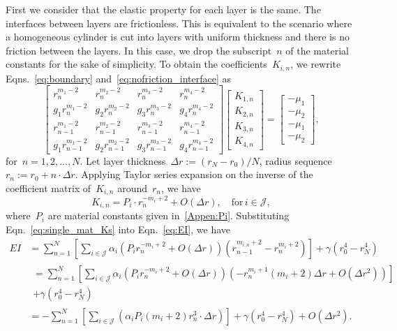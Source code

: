 \documentclass[preprint,10pt,times]{elsarticle}
\numberwithin{equation}{section}
\newcommand{\pr}[1]{\left( #1 \right)}
\renewcommand{\>}{$\Rightarrow$}
\begin{document}
First we consider that the elastic property for each layer is the same. The interfaces between layers are frictionless. This is equivalent to the scenario where a homogeneous cylinder is cut into layers with uniform thickness and there is no friction between the layers. In this case, we drop the subscript~$n$ of the material constants for the sake of simplicity. To obtain the coefficients~$K_{i,n}$, we rewrite Eqns.~\eqref{eq:boundary} and~\eqref{eq:nofriction_interface} as
\begin{equation}
	\begin{bmatrix}
	r_n^{m_1 - 2} & r_n^{m_2 - 2} & r_n^{m_3 - 2} & r_n^{m_4 - 2} \\
	g_1 r_n^{m_1 - 2} & g_2 r_n^{m_2 - 2} & g_3 r_n^{m_3 - 2} & g_4 r_n^{m_4 - 2} \\
	r_{n-1}^{m_1 - 2} & r_{n-1}^{m_2 - 2} & r_{n-1}^{m_3 - 2} & r_{n-1}^{m_4 - 2} \\
	g_1 r_{n-1}^{m_1 - 2} & g_2 r_{n-1}^{m_2 - 2} & g_3 r_{n-1}^{m_3 - 2} & g_4 r_{n-1}^{m_4 - 2}
	\end{bmatrix}
	\begin{bmatrix}
	K_{1,n} \\ K_{2,n} \\ K_{3,n} \\ K_{4,n}
	\end{bmatrix}
	=
	\begin{bmatrix}
	-\mu_1 \\ -\mu_2 \\ -\mu_1 \\ -\mu_2
	\end{bmatrix},
	\label{eq:eqs of Kin_one_mat_no_friction}
\end{equation}
for~$n = 1,2,\dots,N$. Let layer thickness~$\Delta r := \pr{r_N-r_0}/N$, radius sequence~$r_n := r_0 + n\cdot \Delta r$. Applying Taylor series expansion on the inverse of the coefficient matrix of~$K_{i,n}$ around~$r_n$, we have
\begin{equation}
	K_{i,n} = P_i \cdot r_n^{-m_i + 2} + O(\Delta r), \quad \text{for}\, i \in \mathcal{J},
	\label{eq:single_mat_Ks}
\end{equation}
where~$P_i$ are material constants given in~\ref{Appen:Pi}. Substituting Eqn.~\eqref{eq:single_mat_Ks} into Eqn.~\eqref{eq:EI}, we have
\begin{equation}
	\begin{aligned}
	EI & = \sum_{n=1}^{N} \left[ \sum_{i \in \mathcal{J}} \alpha_i \left( P_i r_n^{-m_i + 2} + O(\Delta r) \right) (r_{n-1}^{m_{i,n}+2} - r_{n}^{m_{i}+2}) \right] + \gamma (r_0^4 - r_N^4) \\
	 & \begin{split}
		= \sum_{n=1}^{N} \left[ \sum_{i \in \mathcal{J}} \alpha_i \left( P_i r_n^{-m_i + 2} + O(\Delta r) \right) (- r_{n}^{m_{i}+1}(m_i + 2 ) \Delta r + O(\Delta r^2)) \right] \\
		+ \gamma (r_0^4 - r_N^4)
	   \end{split}\\
	 & = - \sum_{n=1}^{N} \left[ \sum_{i \in \mathcal{J}} \left( \alpha_i P_i (m_i + 2 ) r_n^{3} \cdot \Delta r \right) \right] + \gamma (r_0^4 - r_N^4) + O(\Delta r^2).
	\end{aligned}
	\label{eq:single_mat_EI}
\end{equation}
\end{document}
